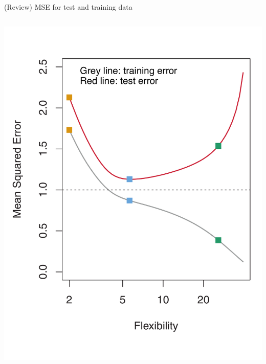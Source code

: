 \documentclass[aspectratio=169]{beamer}
\begin{document}
\begin{frame}{(Review) MSE for test and training data}
\begin{columns}
\includegraphics[scale=0.25]{figures/islr2_9b.pdf}
\end{columns}


\end{frame}
\end{document}
